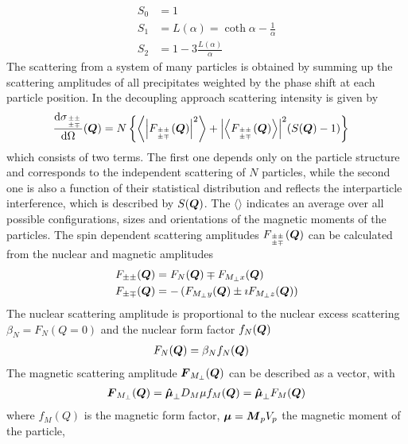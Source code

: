 \begin{subequations}
\label{eq:S_i_Boltzmann}
\begin{align}
S_0 & = 1 \\
S_1 & = L(\alpha) = \coth\alpha - \frac{1}{\alpha} \\
S_2 & = 1-3\frac{L(\alpha)}{\alpha}
\end{align}
\end{subequations}
The scattering from a system of many particles is obtained
by summing up the scattering amplitudes of all precipitates
weighted by the phase shift at each particle position.
In the decoupling approach scattering intensity is given by
\begin{align} \label{eq:I_ijSQ}
\frac{\mathrm{d}\sigma_{{\pm\pm}\atop{\pm\mp}}}{\mathrm{d}\Omega}(\BM{Q}) &=
N\left\{
\left\langle \abs{F_{{\pm\pm}\atop{\pm\mp}}(\BM{Q})}^2\right\rangle
+ \abs{\left\langle F_{{\pm\pm}\atop{\pm\mp}}(\BM{Q})\right\rangle}^2 (S(\BM{Q})-1)
\right\}
\end{align}
which consists of two terms. The first one depends only
on the particle structure and corresponds to the independent
scattering of $N$ particles, while the second one is also a
function of their statistical distribution and reflects the interparticle
interference, which is described by $S(\BM{Q})$. The $\langle\rangle$ indicates
an average over all possible configurations, sizes and orientations of the
magnetic moments of the particles. The spin dependent scattering amplitudes
$F_{{\pm\pm}\atop{\pm\mp}}(\BM{Q})$ can be calculated from the nuclear and magnetic
amplitudes
\begin{align}
F_{\pm\pm}(\BM{Q}) & = F_N(\BM{Q}) \mp F_{M_\perp x}(\BM{Q}) \\
F_{\pm\mp}(\BM{Q}) & = -\left(F_{M_\perp y}(\BM{Q}) \pm \imath F_{M_\perp z}(\BM{Q})\right)
\end{align}
The nuclear scattering amplitude is proportional to the nuclear excess scattering $\beta_N=F_N(Q=0)$
and the nuclear form factor $f_N(\BM{Q})$
\begin{align}
F_N(\BM{Q}) &= \beta_N f_N(\BM{Q})
\end{align}
The magnetic scattering amplitude $\BM{F}_{M_\perp}(\BM{Q})$ can be described as a vector,
with
\begin{align}
\BM{F}_{M_\perp}(\BM{Q}) =  \BM{\hat{\mu}}_\perp D_M \mu f_M(\BM{Q})=\BM{\hat{\mu}}_\perp F_M(\BM{Q})
\end{align}
where $f_M(Q)$ is the magnetic form factor, $\BM{\mu}=\BM{M}_pV_p$ the magnetic moment of the particle,
